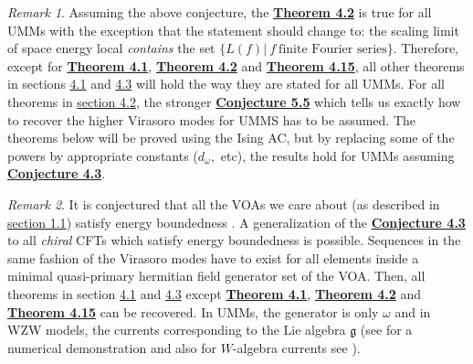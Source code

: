 \documentclass[twoside,11pt,titlepage]{amsart}
\renewcommand{\=}[1]{\stackrel{#1}{=}} %
\theoremstyle{definition}
\theoremstyle{remark}
\newtheorem{rmk}{Remark}
\begin{document}
\begin{rmk}\label{rmk8}
Assuming the above conjecture, the \hyperref[thm4.2]{\textbf{Theorem 4.2}} is true for all UMMs with the exception that the statement should change to: the scaling limit of space energy local \textit{contains} the set $\{L(f)| \ f \ \text{finite Fourier series}\}$. Therefore, except for \hyperref[thm4.1]{\textbf{Theorem 4.1}}, \hyperref[thm4.2]{\textbf{Theorem 4.2}} and \hyperref[thm4.15]{\textbf{Theorem 4.15}}, all other theorems in sections \hyperref[4.1]{4.1} and \hyperref[4.3]{4.3} will hold the way they are stated for all UMMs. For all theorems in \hyperref[4.2]{section 4.2}, the stronger \hyperref[cnj5.5]{\textbf{Conjecture 5.5}} which tells us exactly how to recover the higher Virasoro modes for UMMS has to be assumed. 
The theorems below will be proved using the Ising AC, but by replacing some of the powers by appropriate constants ($d_\omega,$ etc), the results hold for UMMs assuming \hyperref[cnj4.3]{\textbf{Conjecture 4.3}}.
\end{rmk}
\begin{rmk}\label{rmk9}
It is conjectured that all the VOAs we care about (as described in \hyperref[1.1]{section 1.1}) satisfy energy boundedness \cite[Conjecture 8.18]{carpi2015vertex}. A generalization of the \hyperref[cnj4.3]{\textbf{Conjecture 4.3}} to all \textit{chiral} CFTs which satisfy energy boundedness is possible. Sequences in the same fashion of the Virasoro modes have to exist for all elements inside a minimal quasi-primary hermitian field generator set of the VOA. Then, all theorems in section \hyperref[4.1]{4.1} and \hyperref[4.3]{4.3} except \hyperref[thm4.1]{\textbf{Theorem 4.1}}, \hyperref[thm4.2]{\textbf{Theorem 4.2}} and \hyperref[thm4.15]{\textbf{Theorem 4.15}} can be recovered. In UMMs, the generator is only $\omega$ and in WZW models, the currents corresponding to the Lie algebra $\mathfrak{g}$ (see \cite{bondesan2015chiral} for a numerical demonstration and also for $W$-algebra currents see \cite{gainutdinov2014lattice}).
\end{rmk}
\end{document}
